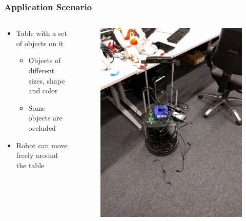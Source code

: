 \documentclass[t]{beamer} %
\begin{document}
\begin{frame}
	\frametitle{ Application Scenario }
	\begin{columns}
		\begin{column}{0.65\textwidth}
			\begin{itemize}
				\item Table with a set of objects on it
				\begin{itemize}
					\item Objects of different sizes, shape and color
					\item Some objects are occluded
				\end{itemize}
				\item Robot can move freely around the table
			\end{itemize}		
		\end{column}
		\begin{column}{0.3\textwidth}
			\begin{figure}[h]
				\vspace{-0.5cm}
				\includegraphics[width=1\textwidth]{src/turtle.jpeg}
			\end{figure}
		\end{column}
	\end{columns}
\end{frame}
\end{document}
